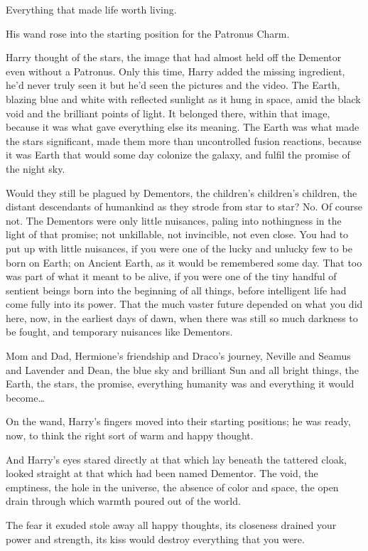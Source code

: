 Everything that made life worth living.

His wand rose into the starting position for the Patronus Charm.

Harry thought of the stars, the image that had almost held off the Dementor even without a Patronus. Only this time, Harry added the missing ingredient, he'd never truly seen it but he'd seen the pictures and the video. The Earth, blazing blue and white with reflected sunlight as it hung in space, amid the black void and the brilliant points of light. It belonged there, within that image, because it was what gave everything else its meaning. The Earth was what made the stars significant, made them more than uncontrolled fusion reactions, because it was Earth that would some day colonize the galaxy, and fulfil the promise of the night sky.

Would they still be plagued by Dementors, the children's children's children, the distant descendants of humankind as they strode from star to star? No. Of course not. The Dementors were only little nuisances, paling into nothingness in the light of that promise; not unkillable, not invincible, not even close. You had to put up with little nuisances, if you were one of the lucky and unlucky few to be born on Earth; on Ancient Earth, as it would be remembered some day. That too was part of what it meant to be alive, if you were one of the tiny handful of sentient beings born into the beginning of all things, before intelligent life had come fully into its power. That the much vaster future depended on what you did here, now, in the earliest days of dawn, when there was still so much darkness to be fought, and temporary nuisances like Dementors.

Mom and Dad, Hermione's friendship and Draco's journey, Neville and Seamus and Lavender and Dean, the blue sky and brilliant Sun and all bright things, the Earth, the stars, the promise, everything humanity was and everything it would become{\ldots}

On the wand, Harry's fingers moved into their starting positions; he was ready, now, to think the right sort of warm and happy thought.

And Harry's eyes stared directly at that which lay beneath the tattered cloak, looked straight at that which had been named Dementor. The void, the emptiness, the hole in the universe, the absence of color and space, the open drain through which warmth poured out of the world.

The fear it exuded stole away all happy thoughts, its closeness drained your power and strength, its kiss would destroy everything that you were.

